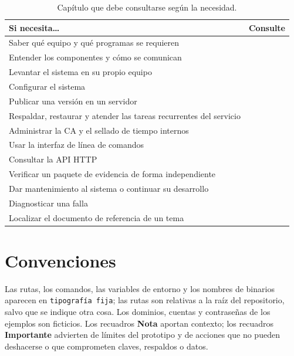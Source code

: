 \begin{table}[H]
  \centering
  \caption{Capítulo que debe consultarse según la
    necesidad.}\label{tab:intro-lectura}
  \begin{tabularx}{\textwidth}{Y L{4.6cm}}
    \toprule
    \textbf{Si necesita\ldots} & \textbf{Consulte} \\
    \midrule
    Saber qué equipo y qué programas se requieren
      &  \\
    Entender los componentes y cómo se comunican
      &  \\
    Levantar el sistema en su propio equipo
      &  \\
    Configurar el sistema
      &  \\
    Publicar una versión en un servidor
      &  \\
    Respaldar, restaurar y atender las tareas recurrentes del servicio
      &  \\
    Administrar la CA y el sellado de tiempo internos
      &  \\
    Usar la interfaz de línea de comandos
      &  \\
    Consultar la API HTTP
      &  \\
    Verificar un paquete de evidencia de forma independiente
      &  \\
    Dar mantenimiento al sistema o continuar su desarrollo
      &  \\
    Diagnosticar una falla
      &  \\
    Localizar el documento de referencia de un tema
      &  \\
    \bottomrule
  \end{tabularx}
\end{table}

\section{Convenciones}\label{sec:intro-convenciones}

Las rutas, los comandos, las variables de entorno y los nombres de binarios
aparecen en \texttt{tipografía fija}; las rutas son relativas a la raíz del
repositorio, salvo que se indique otra cosa. Los dominios, cuentas y
contraseñas de los ejemplos son ficticios. Los recuadros \textbf{Nota}
aportan contexto; los recuadros \textbf{Importante} advierten de límites del
prototipo y de acciones que no pueden deshacerse o que comprometen claves,
respaldos o datos.

